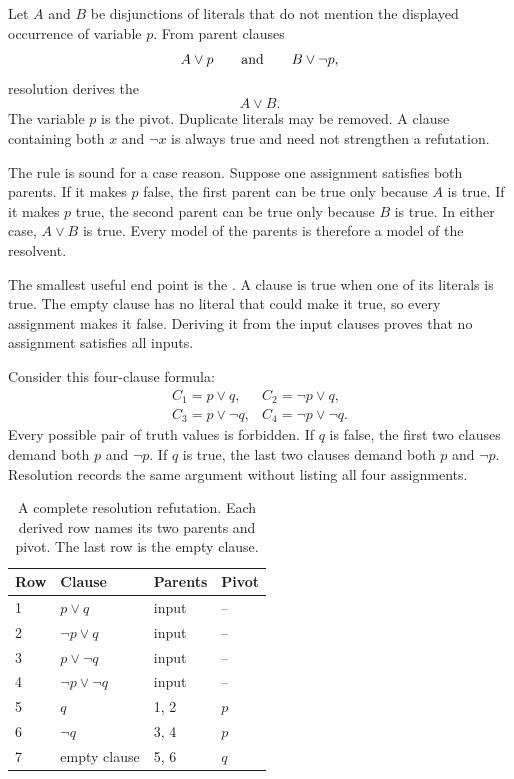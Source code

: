 \begin{definition}[title={Resolution rule}]
Let \(A\) and \(B\) be disjunctions of literals that do not mention the
displayed occurrence of variable \(p\). From parent clauses
\[
  A\lor p
  \qquad\hbox{and}\qquad
  B\lor\neg p,
\]
resolution derives the 
\[
  A\lor B.
\]
The variable \(p\) is the pivot. Duplicate literals may be removed. A clause
containing both \(x\) and \(\neg x\) is always true and need not strengthen a
refutation.
\end{definition}

The rule is sound for a case reason. Suppose one assignment satisfies both
parents. If it makes \(p\) false, the first parent can be true only because
\(A\) is true. If it makes \(p\) true, the second parent can be true only
because \(B\) is true. In either case, \(A\lor B\) is true. Every model of the
parents is therefore a model of the resolvent.

The smallest useful end point is the . A clause is true
when one of its literals is true. The empty clause has no literal that could
make it true, so every assignment makes it false. Deriving it from the input
clauses proves that no assignment satisfies all inputs.

Consider this four-clause formula:
\[
\begin{array}{ll}
C_1=p\lor q,       & C_2=\neg p\lor q,\\
C_3=p\lor\neg q,  & C_4=\neg p\lor\neg q.
\end{array}
\]
Every possible pair of truth values is forbidden. If \(q\) is false, the first
two clauses demand both \(p\) and \(\neg p\). If \(q\) is true, the last two
clauses demand both \(p\) and \(\neg p\). Resolution records the same argument
without listing all four assignments.

\begin{table}[htbp]
\centering
\caption{A complete resolution refutation. Each derived row names its two
parents and pivot. The last row is the empty clause.}
\begin{tabular}{@{}llll@{}}
\toprule
Row & Clause & Parents & Pivot \\
\midrule
1 & \(p\lor q\) & input & -- \\
2 & \(\neg p\lor q\) & input & -- \\
3 & \(p\lor\neg q\) & input & -- \\
4 & \(\neg p\lor\neg q\) & input & -- \\
5 & \(q\) & 1, 2 & \(p\) \\
6 & \(\neg q\) & 3, 4 & \(p\) \\
7 & empty clause & 5, 6 & \(q\) \\
\bottomrule
\end{tabular}
\label{tab:resolution-refutation}
\end{table}

